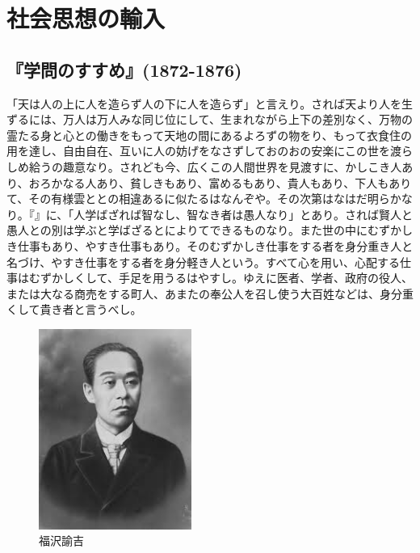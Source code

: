 

\chapter{社会思想の輸入}



\section{『学問のすすめ』(1872-1876)}





「天は人の上に人を造らず人の下に人を造らず」と言えり。されば天より人を生ずるには、万人は万人みな同じ位にして、生まれながら上下の差別なく、万物の霊たる身と心との働きをもって天地の間にあるよろずの物をり、もって衣食住の用を達し、自由自在、互いに人の妨げをなさずしておのおの安楽にこの世を渡らしめ給うの趣意なり。されども今、広くこの人間世界を見渡すに、かしこき人あり、おろかなる人あり、貧しきもあり、富めるもあり、貴人もあり、下人もありて、その有様雲ととの相違あるに似たるはなんぞや。その次第はなはだ明らかなり。『』に、「人学ばざれば智なし、智なき者は愚人なり」とあり。されば賢人と愚人との別は学ぶと学ばざるとによりてできるものなり。また世の中にむずかしき仕事もあり、やすき仕事もあり。そのむずかしき仕事をする者を身分重き人と名づけ、やすき仕事をする者を身分軽き人という。すべて心を用い、心配する仕事はむずかしくして、手足を用うるはやすし。ゆえに医者、学者、政府の役人、または大なる商売をする町人、あまたの奉公人を召し使う大百姓などは、身分重くして貴き者と言うべし。

 \begin{figure}[htbp]
   \centering
 \includegraphics[width=50mm]{images/fukuzawa.jpg}  
   \caption{福沢諭吉}
 \end{figure}


